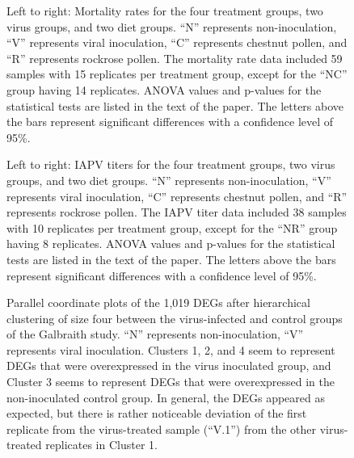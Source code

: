 \documentclass{bmcart}
\begin{document}
\begin{linenumbers}
\begin{backmatter}
\begin{figure}[h!]
\caption{
Left to right: Mortality rates for the four treatment groups, two virus groups, and two diet groups. ``N'' represents non-inoculation, ``V'' represents viral inoculation, ``C'' represents chestnut pollen, and ``R'' represents rockrose pollen. The mortality rate data included 59 samples with 15 replicates per treatment group, except for the ``NC'' group having 14 replicates. ANOVA values and p-values for the statistical tests are listed in the text of the paper. The letters above the bars represent significant differences with a confidence level of 95\%.}
\end{figure}

\begin{figure}[h!]
\caption{
Left to right: IAPV titers for the four treatment groups, two virus groups, and two diet groups. ``N'' represents non-inoculation, ``V'' represents viral inoculation, ``C'' represents chestnut pollen, and ``R'' represents rockrose pollen. The IAPV titer data included 38 samples with 10 replicates per treatment group, except for the ``NR'' group having 8 replicates. ANOVA values and p-values for the statistical tests are listed in the text of the paper. The letters above the bars represent significant differences with a confidence level of 95\%.}
\end{figure}

\begin{figure}[h!]
\caption{
Parallel coordinate plots of the 1,019 DEGs after hierarchical clustering of size four between the virus-infected and control groups of the Galbraith study. ``N'' represents non-inoculation, ``V'' represents viral inoculation. Clusters 1, 2, and 4 seem to represent DEGs that were overexpressed in the virus inoculated group, and Cluster 3 seems to represent DEGs that were overexpressed in the non-inoculated control group. In general, the DEGs appeared as expected, but there is rather noticeable deviation of the first replicate from the virus-treated sample (``V.1'') from the other virus-treated replicates in Cluster 1.}
\end{figure}


\end{backmatter}
\end{linenumbers}
\end{document}
